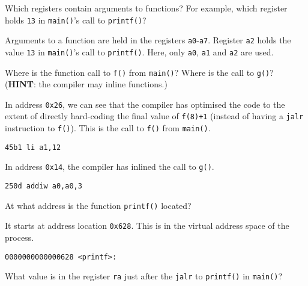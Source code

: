 \documentclass[11pt]{exam}
\begin{document}
\begin{questions}
    \question[3] Which registers contain arguments to functions? For example, which register holds \texttt{13} in \texttt{main()}'s call to \texttt{printf()}?
       
       \begin{solution}
           Arguments to a function are held in the registers \texttt{a0}-\texttt{a7}.
           Register \texttt{a2} holds the value \texttt{13} in \texttt{main()}'s call to \texttt{printf()}. Here, only \texttt{a0}, \texttt{a1} and \texttt{a2} are used.
       \end{solution}
    
    
    \question[2] Where is the function call to \texttt{f()} from \texttt{main()}? Where is the call to \texttt{g()}? (\textbf{HINT}: the compiler may inline functions.)
    
        \begin{solution}

            In address \texttt{0x26}, we can see that the compiler has optimised the code to the extent of directly hard-coding the final value of \texttt{f(8)+1} (instead of having a \texttt{jalr} instruction to \texttt{f()}). This is the call to \texttt{f()} from \texttt{main()}.
            \begin{center}
                \texttt{45b1       li  a1,12}
            \end{center}

            In address \texttt{0x14}, the compiler has inlined the call to \texttt{g()}.
            \begin{center}
                \texttt{250d       addiw  a0,a0,3}
            \end{center}
        \end{solution}
    
    \question[2] At what address is the function \texttt{printf()} located?
        \begin{solution}
            It starts at address location \texttt{0x628}. This is in the virtual address space of the process.
            \begin{center}
                \texttt{0000000000000628 <printf>:}
            \end{center}

        \end{solution}
        
    
    \question[2] What value is in the register \texttt{ra} just after the \texttt{jalr} to \texttt{printf()} in \texttt{main()}?
    

\end{questions}
\end{document}
